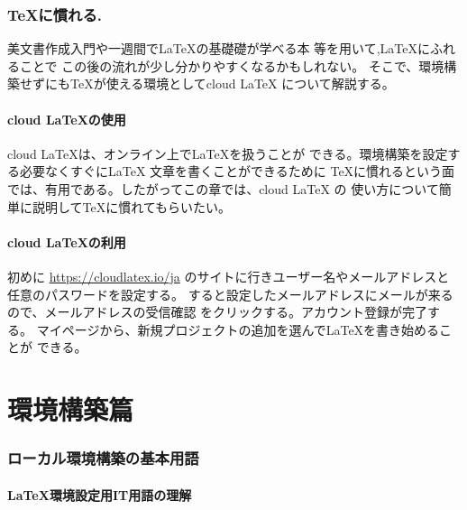 \documentclass{ltjsarticle}
\begin{document}
\section{\TeX に慣れる.}
美文書作成入門\cite{美文書本}や一週間で\LaTeX の基礎礎が学べる本
\cite{一週間基礎}等を用いて,\LaTeX にふれることで
この後の流れが少し分かりやすくなるかもしれない。
そこで、環境構築せずにも\TeX が使える環境としてcloud \LaTeX 
について解説する。
\subsection{cloud \LaTeX の使用}
cloud \LaTeX は、オンライン上で\LaTeX を扱うことが
できる。環境構築を設定する必要なくすぐにLaTeX 文章を書くことができるために
TeXに慣れるという面では、有用である。したがってこの章では、cloud LaTeX の
使い方について簡単に説明して\TeX に慣れてもらいたい。
\subsection{cloud \LaTeX の利用}
初めに
\url{https://cloudlatex.io/ja}
のサイトに行きユーザー名やメールアドレスと任意のパスワードを設定する。
すると設定したメールアドレスにメールが来るので、メールアドレスの受信確認
をクリックする。アカウント登録が完了する。
マイページから、新規プロジェクトの追加を選んで\LaTeX を書き始めることが
できる。
\part{環境構築篇}
\section{ローカル環境構築の基本用語}
\subsection{\LaTeX 環境設定用IT用語の理解}
\end{document}
